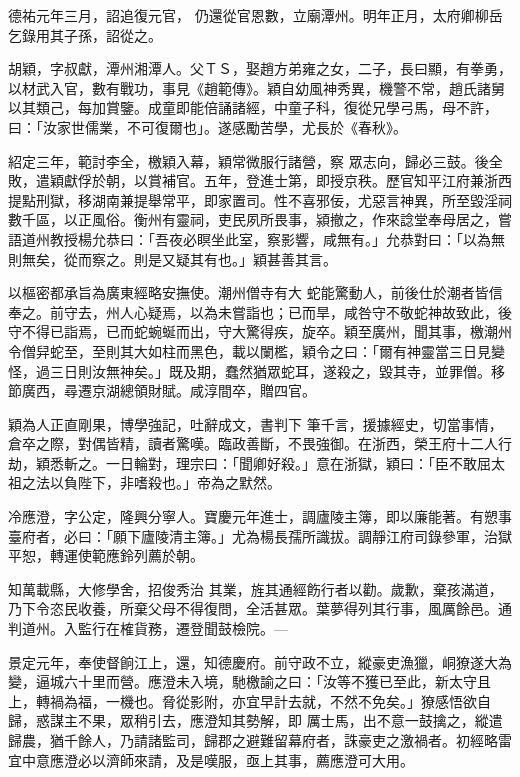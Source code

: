 \begin{pinyinscope}
 德祐元年三月，詔追復元官，
 仍還從官恩數，立廟潭州。明年正月，太府卿柳岳乞錄用其子孫，詔從之。



 胡穎，字叔獻，潭州湘潭人。父ＴＳ，娶趙方弟雍之女，二子，長曰顯，有拳勇，以材武入官，數有戰功，事見《趙範傳》。穎自幼風神秀異，機警不常，趙氏諸舅以其類己，每加賞鑒。成童即能倍誦諸經，中童子科，復從兄學弓馬，母不許，曰：「汝家世儒業，不可復爾也」。遂感勵苦學，尤長於《春秋》。



 紹定三年，範討李全，檄穎入幕，穎常微服行諸營，察
 眾志向，歸必三鼓。後全敗，遣穎獻俘於朝，以賞補官。五年，登進士第，即授京秩。歷官知平江府兼浙西提點刑獄，移湖南兼提舉常平，即家置司。性不喜邪佞，尤惡言神異，所至毀淫祠數千區，以正風俗。衡州有靈祠，吏民夙所畏事，潁撤之，作來諗堂奉母居之，嘗語道州教授楊允恭曰：「吾夜必瞑坐此室，察影響，咸無有。」允恭對曰：「以為無則無矣，從而察之。則是又疑其有也。」穎甚善其言。



 以樞密都承旨為廣東經略安撫使。潮州僧寺有大
 蛇能驚動人，前後仕於潮者皆信奉之。前守去，州人心疑焉，以為未嘗詣也；已而旱，咸咎守不敬蛇神故致此，後守不得已詣焉，已而蛇蜿蜒而出，守大驚得疾，旋卒。穎至廣州，聞其事，檄潮州令僧舁蛇至，至則其大如柱而黑色，載以闌檻，穎令之曰：「爾有神靈當三日見變怪，過三日則汝無神矣。」既及期，蠢然猶眾蛇耳，遂殺之，毀其寺，並罪僧。移節廣西，尋遷京湖總領財賦。咸淳間卒，贈四官。



 穎為人正直剛果，博學強記，吐辭成文，書判下
 筆千言，援據經史，切當事情，倉卒之際，對偶皆精，讀者驚嘆。臨政善斷，不畏強御。在浙西，榮王府十二人行劫，穎悉斬之。一日輪對，理宗曰：「聞卿好殺。」意在浙獄，穎曰：「臣不敢屈太祖之法以負陛下，非嗜殺也。」帝為之默然。



 冷應澄，字公定，隆興分寧人。寶慶元年進士，調廬陵主簿，即以廉能著。有愬事臺府者，必曰：「願下廬陵清主簿。」尤為楊長孺所識拔。調靜江府司錄參軍，治獄平恕，轉運使範應鈴列薦於朝。



 知萬載縣，大修學舍，招俊秀治
 其業，旌其通經飭行者以勸。歲歉，棄孩滿道，乃下令恣民收養，所棄父母不得復問，全活甚眾。葉夢得列其行事，風厲餘邑。通判道州。入監行在榷貨務，遷登聞鼓檢院。—



 景定元年，奉使督餉江上，還，知德慶府。前守政不立，縱豪吏漁獵，峒獠遂大為變，逼城六十里而營。應澄未入境，馳檄諭之曰：「汝等不獲已至此，新太守且上，轉禍為福，一機也。脅從影附，亦宜早計去就，不然不免矣。」獠感悟欲自歸，惑謀主不果，眾稍引去，應澄知其勢解，即
 厲士馬，出不意一鼓擒之，縱遣歸農，猶千餘人，乃請諸監司，歸郡之避難留幕府者，誅豪吏之激禍者。初經略雷宜中意應澄必以濟師來請，及是嘆服，亟上其事，薦應澄可大用。




\end{pinyinscope}
